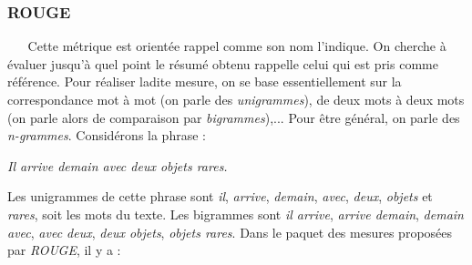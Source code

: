 \subsubsection{ROUGE \cite{lin2004rouge}}\label{ROUGEmetricsSection}
$ _{} $ $ _{} $ $ _{} $ $ _{} $ $ _{} $Cette métrique est orientée rappel comme son nom l'indique. On cherche à évaluer jusqu'à quel point le résumé obtenu rappelle celui qui est pris comme référence. Pour réaliser ladite mesure, on se base essentiellement sur la correspondance mot à mot (on parle des \textit{unigrammes}), de deux mots à deux mots (on parle alors de comparaison par \textit{bigrammes}),... Pour être général, on parle des \textit{n-grammes}. Considérons la phrase :
\begin{center}
\textit{Il arrive demain avec deux objets rares.}
\end{center}
Les unigrammes de cette phrase sont \textit{il}, \textit{arrive}, \textit{demain}, \textit{avec}, \textit{deux}, \textit{objets} et \textit{rares}, soit les mots du texte. Les bigrammes sont \textit{il arrive}, \textit{arrive demain}, \textit{demain avec}, \textit{avec deux}, \textit{deux objets}, \textit{objets rares}.
Dans le paquet des mesures proposées par \textit{ROUGE}, il y a :
